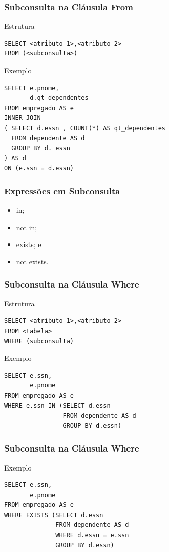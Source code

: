 \documentclass{beamer}
\begin{document}
\begin{frame}[fragile]
\frametitle{Subconsulta na Cláusula From}

\begin{block}{Estrutura}
	\begin{lstlisting}
SELECT <atributo 1>,<atributo 2>
FROM (<subconsulta>)	
	\end{lstlisting}
\end{block}\vfill

\begin{exampleblock}{Exemplo}
	\begin{lstlisting}
SELECT e.pnome,
       d.qt_dependentes
FROM empregado AS e
INNER JOIN 
( SELECT d.essn , COUNT(*) AS qt_dependentes
  FROM dependente AS d
  GROUP BY d. essn
) AS d
ON (e.ssn = d.essn)
	\end{lstlisting}
\end{exampleblock}
\end{frame}

\begin{frame}
\frametitle{Expressões em Subconsulta}

\begin{itemize}
	\item in;
	\item not in;
	\item exists; e
	\item not exists.
\end{itemize}
\end{frame}

\begin{frame}[fragile]
\frametitle{Subconsulta na Cláusula Where}

\begin{block}{Estrutura}
	\begin{lstlisting}
SELECT <atributo 1>,<atributo 2>
FROM <tabela>
WHERE (subconsulta)	
	\end{lstlisting}
\end{block}\vfill

\begin{exampleblock}{Exemplo}
	\begin{lstlisting}
SELECT e.ssn,
       e.pnome
FROM empregado AS e
WHERE e.ssn IN (SELECT d.essn
                FROM dependente AS d
                GROUP BY d.essn)	
	\end{lstlisting}
\end{exampleblock}
\end{frame}

\begin{frame}[fragile]
\frametitle{Subconsulta na Cláusula Where}

\begin{exampleblock}{Exemplo}
	\begin{lstlisting}
SELECT e.ssn,
       e.pnome
FROM empregado AS e
WHERE EXISTS (SELECT d.essn
              FROM dependente AS d
              WHERE d.essn = e.ssn
              GROUP BY d.essn)
	\end{lstlisting}
\end{exampleblock}
\end{frame}
\end{document}

